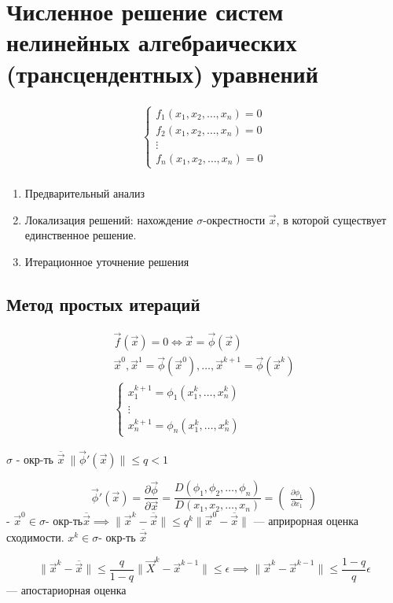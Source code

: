\section{Численное решение систем нелинейных алгебраических (трансцендентных)
  уравнений}

\begin{gather*}
  \begin{cases}
    f_1(x_1, x_2, \dotsc, x_n) = 0\\
    f_2(x_1, x_2, \dotsc, x_n) = 0\\
    \vdots\\
    f_n(x_1, x_2, \dotsc, x_n) = 0
  \end{cases} \\
\end{gather*}

\begin{enumerate}
\item Предварительный анализ
\item Локализация решений: нахождение $\sigma$-окрестности $\vec{x}$, в которой
  существует единственное решение.
\item Итерационное уточнение решения
\end{enumerate}

\subsection{Метод простых итераций}
\begin{gather*}
  \vec{f}(\vec{x}) = 0 \iff \vec{x} = \vec{\phi}(\vec{x}) \\
  \vec{x}^0, \vec{x}^1 = \vec{\phi}(\vec{x}^0),\dotsc, \vec{x}^{k + 1} =
  \vec{\phi}(\vec{x}^k) \\
  \begin{cases}
    x_1^{k + 1} = \phi_1(x_1^k, \dotsc, x_n^k) \\
    \vdots\\
    x_n^{k + 1} = \phi_n(x_1^k, \dotsc, x_n^k)
  \end{cases}
\end{gather*}

$\sigma$ - окр-ть $\overline{\vec{x}}\ \|\vec{\phi}'(\vec{x})\| \leq q < 1$

\[
  \vec{\phi}'(\vec{x}) = \frac{\partial \vec{\phi}}{\partial \vec{x}} =
  \frac{D(\phi_1, \phi_2, \dotsc, \phi_n)}{D(x_1, x_2, \dotsc, x_n)} =
  \begin{pmatrix}
    \frac{\partial \phi_1}{\partial x_1}
  \end{pmatrix}
\] - $\vec{x}^0 \in \sigma\text{- окр-ть} \overline{\vec{x}} \implies
\|\vec{x}^k - \overline{\vec{x}}\| \leq q^k \|\vec{x}^0 - \overline{\vec{x}}\|$
--- априрорная оценка сходимости.
$x^k \in \sigma\text{- окр-ть } \overline{\vec{x}}$

\[
  \|\vec{x}^k - \overline{\vec{x}}\| \leq \frac{q}{1 - q} \|\vec{X}^k -
  \vec{x}^{k - 1}\| \leq \epsilon \implies \|\vec{x}^k - \vec{x}^{k - 1}\| \leq
  \frac{1 - q}{q} \epsilon
\] --- апостариорная оценка